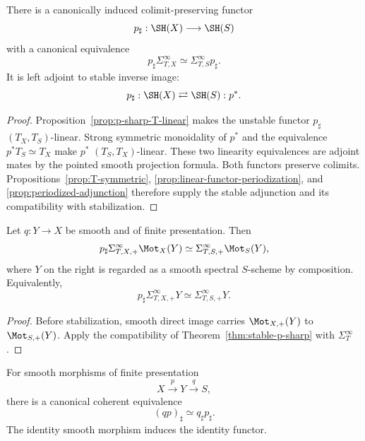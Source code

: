 \begin{theorem}
\label{thm:stable-p-sharp}
There is a canonically induced colimit-preserving functor
\[
    p_\sharp:\SH(X)\longrightarrow\SH(S)
\]
with a canonical equivalence
\[
    p_\sharp\Sigma_{T,X}^\infty
    \simeq
    \Sigma_{T,S}^\infty p_\sharp.
\]
It is left adjoint to stable inverse image:
\[
    p_\sharp:\SH(X)
    \rightleftarrows
    \SH(S):p^*.
\]
\end{theorem}

\begin{proof}
Proposition~\ref{prop:p-sharp-T-linear} makes the unstable functor $p_\sharp$ $(T_X,T_S)$-linear.
Strong symmetric monoidality of $p^*$ and the equivalence $p^*T_S\simeq T_X$ make $p^*$
$(T_S,T_X)$-linear.  These two linearity equivalences are adjoint mates by the pointed smooth
projection formula.  Both functors preserve colimits.  Propositions~\ref{prop:T-symmetric},
\ref{prop:linear-functor-periodization}, and \ref{prop:periodized-adjunction} therefore supply the
stable adjunction and its compatibility with stabilization.
\end{proof}

\begin{proposition}
\label{prop:p-sharp-on-suspension-spectra}
Let $q:Y\to X$ be smooth and of finite presentation.  Then
\[
    p_\sharp\Sigma_{T,X,+}^\infty\Mot_X(Y)
    \simeq
    \Sigma_{T,S,+}^\infty\Mot_S(Y),
\]
where $Y$ on the right is regarded as a smooth spectral $S$-scheme by composition.
Equivalently,
\[
    p_\sharp\Sigma_{T,X,+}^\infty Y
    \simeq
    \Sigma_{T,S,+}^\infty Y.
\]
\end{proposition}

\begin{proof}
Before stabilization, smooth direct image carries $\Mot_{X,+}(Y)$ to $\Mot_{S,+}(Y)$.  Apply the
compatibility of Theorem~\ref{thm:stable-p-sharp} with $\Sigma_T^\infty$.
\end{proof}

\begin{proposition}
\label{prop:stable-p-sharp-composition}
For smooth morphisms of finite presentation
\[
    X\xrightarrow{p}Y\xrightarrow{q}S,
\]
there is a canonical coherent equivalence
\[
    (qp)_\sharp
    \simeq
    q_\sharp p_\sharp.
\]
The identity smooth morphism induces the identity functor.
\end{proposition}

